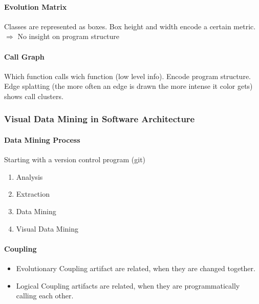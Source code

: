 \documentclass[10pt,a4paper]{article}
\begin{document}
		\paragraph{Evolution Matrix} Classes are represented as boxes. Box height and width encode a certain metric. $ \Rightarrow $ No insight on program structure
		
		\paragraph{Call Graph} Which function calls wich function (low level info). Encode program structure. Edge splatting (the more often an edge is drawn the more intense it color gets) shows call clusters.
		
	\subsubsection{Visual Data Mining in Software Architecture}
		\paragraph{Data Mining Process}
		Starting with a version control program (git)
		\begin{enumerate}
			\item Analysis
			\item Extraction
			\item Data Mining
			\item Visual Data Mining
		\end{enumerate} 
		
		
		\paragraph{Coupling}
		\begin{itemize}
			\item Evolutionary Coupling artifact are related, when they are changed together.
			\item Logical Coupling artifacts are related, when they are programmatically calling each other.
		\end{itemize}
			
\end{document}
